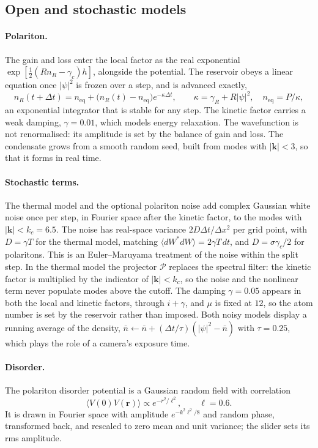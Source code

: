 \documentclass[11pt,a4paper]{article}
\begin{document}
\subsection{Open and stochastic models}

\paragraph{Polariton.} The gain and loss enter the local factor as the real exponential $\exp[\tfrac12(Rn_R-\gamma_c)h]$, alongside the potential. The reservoir obeys a linear equation once $|\psi|^2$ is frozen over a step, and is advanced exactly,
\begin{equation}
n_R(t+\Delta t)=n_{\mathrm{eq}}+\bigl(n_R(t)-n_{\mathrm{eq}}\bigr)e^{-\kappa\Delta t},\qquad \kappa=\gamma_R+R|\psi|^2,\quad n_{\mathrm{eq}}=P/\kappa ,
\end{equation}
an exponential integrator that is stable for any step. The kinetic factor carries a weak damping, $\gamma=0.01$, which models energy relaxation. The wavefunction is not renormalised: its amplitude is set by the balance of gain and loss. The condensate grows from a smooth random seed, built from modes with $|\mathbf k|<3$, so that it forms in real time.

\paragraph{Stochastic terms.} The thermal model and the optional polariton noise add complex Gaussian white noise once per step, in Fourier space after the kinetic factor, to the modes with $|\mathbf k|<k_c=6.5$. The noise has real-space variance $2D\Delta t/\Delta x^2$ per grid point, with $D=\gamma T$ for the thermal model, matching $\langle dW^*dW\rangle=2\gamma T\,dt$, and $D=\sigma\gamma_c/2$ for polaritons. This is an Euler--Maruyama treatment of the noise within the split step. In the thermal model the projector $\mathcal P$ replaces the spectral filter: the kinetic factor is multiplied by the indicator of $|\mathbf k|<k_c$, so the noise and the nonlinear term never populate modes above the cutoff. The damping $\gamma=0.05$ appears in both the local and kinetic factors, through $i+\gamma$, and $\mu$ is fixed at $12$, so the atom number is set by the reservoir rather than imposed. Both noisy models display a running average of the density, $\bar n\leftarrow\bar n+(\Delta t/\tau)(|\psi|^2-\bar n)$ with $\tau=0.25$, which plays the role of a camera's exposure time.

\paragraph{Disorder.} The polariton disorder potential is a Gaussian random field with correlation
\begin{equation}
\langle V(0)V(\mathbf r)\rangle\propto e^{-r^2/\ell^2},\qquad \ell=0.6.
\end{equation} It is drawn in Fourier space with amplitude $e^{-k^2\ell^2/8}$ and random phase, transformed back, and rescaled to zero mean and unit variance; the slider sets its rms amplitude.
\end{document}
